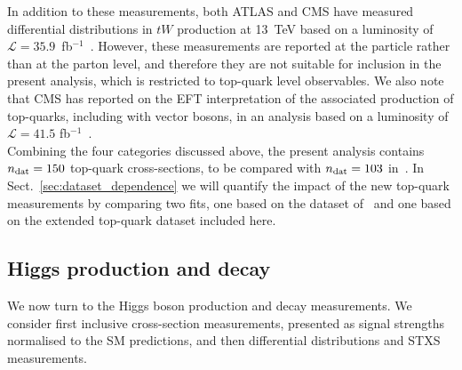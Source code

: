 In addition to these measurements, both ATLAS and CMS have
measured differential distributions in $tW$ production
at 13~TeV based on a luminosity of
$\mathcal{L}=35.9$~fb$^{-1}$~\cite{Aaboud:2017qyi,CMS-PAS-TOP-19-003}.
%
However, these measurements are reported
at the particle rather than
at the parton level, and therefore they are not suitable for inclusion in the
present analysis, which is restricted to top-quark level observables.
%
We also note that CMS has reported on the EFT interpretation of the associated
production of top-quarks, including with vector bosons, in an analysis
based on a luminosity of $\mathcal{L}=41.5$ fb$^{-1}$~\cite{CMS-PAS-TOP-19-001}.
\\
[-0.3cm]

Combining the four categories discussed above, the present analysis contains
$n_{\rm dat}=150$ top-quark cross-sections, to be compared with
$n_{\rm dat}=103$ in~\cite{Hartland:2019bjb}.
%
In Sect.~\ref{sec:dataset_dependence} we will quantify the
impact of the new top-quark
measurements by comparing two fits, one based on the dataset
of~\cite{Hartland:2019bjb} and one based on the extended top-quark dataset
included here.

\subsection{Higgs production and decay}
\label{sec:HiggsProductionDecay}

We now turn to the Higgs boson production and decay measurements.
We consider first inclusive cross-section measurements, presented as signal
strengths normalised to the SM predictions, and then differential
distributions and STXS measurements.

